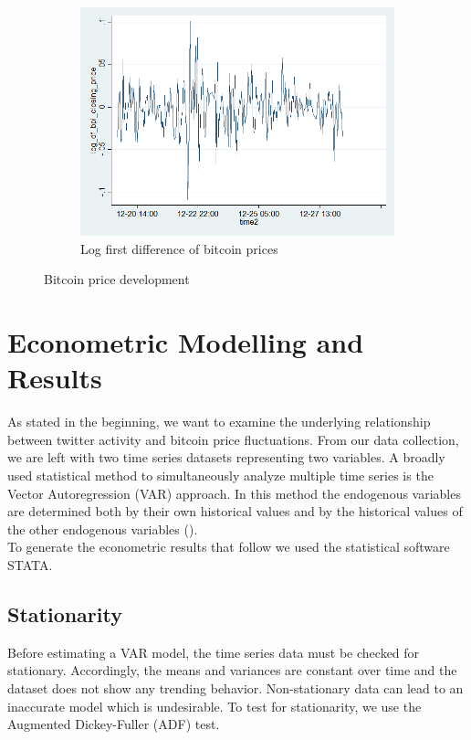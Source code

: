 \documentclass[a4paper,american,12pt]{article}
\begin{document}
\begin{spacing}{1.2}
\begin{figure}[H]
\begin{subfigure}{.3\textwidth}
	\includegraphics[width=1.12\textwidth]{stata_export_graphs/graph_plot_log_df_bpi.png}
	\caption{Log first difference of bitcoin prices}
	\end{subfigure}
\caption{Bitcoin price development}
\end{figure}
	
\clearpage

\section{Econometric Modelling and Results}
\label{sec:EconometricModellingandResults}
As stated in the beginning, we want to examine the underlying relationship between twitter activity and bitcoin price fluctuations. From our data collection, we are left with two time series datasets representing two variables. A broadly used statistical method to simultaneously analyze multiple time series is the Vector Autoregression (VAR) approach. In this method the endogenous variables are determined both by their own historical values and by the historical values of the other endogenous variables (\cite[pp.~4--5]{luetkepohl2007new}).\\
To generate the econometric results that follow we used the statistical software STATA.

\subsection{Stationarity}
Before estimating a VAR model, the time series data must be checked for stationary. Accordingly, the means and variances are constant over time and the dataset does not show any trending behavior. Non-stationary data can lead to an inaccurate model which is undesirable. To test for stationarity, we use the Augmented Dickey-Fuller (ADF) test.\\


\end{spacing}
\end{document}

